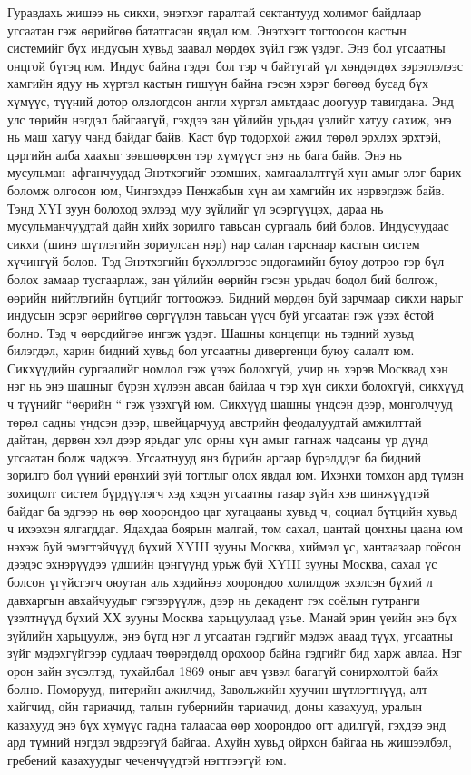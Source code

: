 Гуравдахь жишээ нь сикхи, энэтхэг гаралтай сектантууд холимог байдлаар угсаатан гэж өөрийгөө бататгасан явдал юм. Энэтхэгт тогтоосон кастын системийг бүх индусын хувьд заавал мөрдөх зүйл гэж үздэг. Энэ бол угсаатны онцгой бүтэц юм. Индус байна гэдэг бол тэр ч байтугай үл хөндөгдөх зэрэглэлээс хамгийн ядуу нь хүртэл кастын гишүүн байна гэсэн хэрэг бөгөөд бусад бүх хүмүүс, түүний дотор олзлогдсон англи хүртэл амьтдаас доогуур тавигдана. Энд улс төрийн нэгдэл байгаагүй, гэхдээ зан үйлийн урьдач үзлийг хатуу сахиж, энэ нь маш хатуу чанд байдаг байв. Каст бүр тодорхой ажил төрөл эрхлэх эрхтэй, цэргийн алба хаахыг зөвшөөрсөн тэр хүмүүст энэ нь бага байв. Энэ нь мусульман–афганчуудад Энэтхэгийг эзэмших, хамгаалалтгүй хүн амыг элэг барих боломж олгосон юм, Чингэхдээ Пенжабын хүн ам хамгийн их нэрвэгдэж байв.
Тэнд XYI зуун болоход эхлээд муу зүйлийг үл эсэргүүцэх, дараа нь мусульманчуудтай дайн хийх зорилго тавьсан сургааль бий болов. Индусуудаас сикхи (шинэ шүтлэгийн зориулсан нэр) нар салан гарснаар кастын систем хүчингүй болов. Тэд Энэтхэгийн бүхэллэгээс эндогамийн буюу дотроо гэр бүл болох замаар тусгаарлаж, зан үйлийн өөрийн гэсэн урьдач бодол бий болгож, өөрийн нийтлэгийн бүтцийг тогтоожээ. Бидний мөрдөн буй зарчмаар сикхи нарыг индусын эсрэг өөрийгөө сөргүүлэн тавьсан үүсч буй угсаатан гэж үзэх ёстой болно. Тэд ч өөрсдийгөө ингэж үздэг. Шашны концепци нь тэдний хувьд билэгдэл, харин бидний хувьд бол угсаатны дивергенци буюу салалт юм.
Сикхүүдийн сургаалийг номлол гэж үзэж болохгүй, учир нь хэрэв Москвад хэн нэг нь энэ шашныг бүрэн хүлээн авсан байлаа ч тэр хүн сикхи болохгүй, сикхүүд ч түүнийг “өөрийн “ гэж үзэхгүй юм. Сикхүүд шашны үндсэн дээр, монголчууд төрөл садны үндсэн дээр, швейцарчууд австрийн феодалуудтай амжилттай дайтан, дөрвөн хэл дээр ярьдаг улс орны хүн амыг гагнаж чадсаны үр дүнд угсаатан болж чаджээ. Угсаатнууд янз бүрийн аргаар бүрэлддэг ба бидний зорилго бол үүний ерөнхий зүй тогтлыг олох явдал юм.
Ихэнхи томхон ард түмэн зохицолт систем бүрдүүлэгч хэд хэдэн угсаатны газар зүйн хэв шинжүүдтэй байдаг ба эдгээр нь өөр хоорондоо цаг хугацааны хувьд ч, социал бүтцийн хувьд ч ихээхэн ялгагддаг. Ядахдаа боярын малгай, том сахал, цантай цонхны цаана юм нэхэж буй эмэгтэйчүүд бүхий XYIII зууны Москва, хиймэл үс, хантаазаар гоёсон дээдэс эхнэрүүдээ үдшийн цэнгүүнд урьж буй XYIII зууны Москва, сахал үс болсон үгүйсгэгч оюутан аль хэдийнээ хоорондоо холилдож эхэлсэн бүхий л давхаргын авхайчуудыг гэгээрүүлж, дээр нь декадент гэх соёлын гутранги үзэлтнүүд бүхий ХХ зууны Москва харьцуулаад үзье.
Манай эрин үеийн энэ бүх зүйлийн харьцуулж, энэ бүгд нэг л угсаатан гэдгийг мэдэж аваад түүх, угсаатны зүйг мэдэхгүйгээр судлаач төөрөгдөлд орохоор байна гэдгийг бид харж авлаа. Нэг орон зайн зүсэлтэд, тухайлбал 1869 оныг авч үзвэл багагүй сонирхолтой байх болно. Поморууд, питерийн ажилчид, Завольжийн хуучин шүтлэгтнүүд, алт хайгчид, ойн тариачид, талын губернийн тариачид, доны казахууд, уралын казахууд энэ бүх хүмүүс гадна талаасаа өөр хоорондоо огт адилгүй, гэхдээ энд ард түмний нэгдэл эвдрээгүй байгаа. Ахуйн хувьд ойрхон байгаа нь жишээлбэл, гребений казахуудыг чеченчүүдтэй нэгтгээгүй юм.
